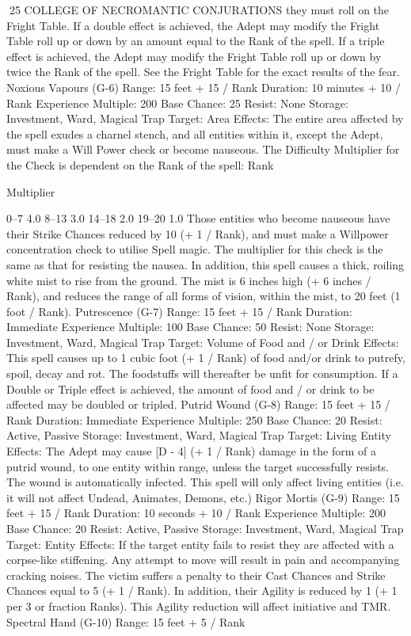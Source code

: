 \documentclass[a4paper]{article}
\begin{document}
\begin{multicols}{3}
25 COLLEGE OF NECROMANTIC CONJURATIONS
they must roll on the Fright Table. If a double
effect is achieved, the Adept may modify the
Fright Table roll up or down by an amount equal to
the Rank of the spell. If a triple effect is achieved,
the Adept may modify the Fright Table roll up or
down by twice the Rank of the spell. See the Fright
Table for the exact results of the fear.
Noxious Vapours (G-6)
Range: 15 feet + 15 / Rank
Duration: 10 minutes + 10 / Rank
Experience Multiple: 200
Base Chance: 25%
Resist: None
Storage: Investment, Ward, Magical Trap
Target: Area
Effects: The entire area affected by the spell exudes
a charnel stench, and all entities within it, except
the Adept, must make a Will Power check or become nauseous. The Difficulty Multiplier for the
Check is dependent on the Rank of the spell:
Rank

Multiplier

0–7
4.0
8–13
3.0
14–18 2.0
19–20 1.0
Those entities who become nauseous have their
Strike Chances reduced by 10 (+ 1 / Rank), and
must make a Willpower concentration check to
utilise Spell magic. The multiplier for this check is
the same as that for resisting the nausea. In addition, this spell causes a thick, roiling white mist to
rise from the ground. The mist is 6 inches high (+ 6
inches / Rank), and reduces the range of all forms
of vision, within the mist, to 20 feet (1 foot /
Rank).
Putrescence (G-7)
Range: 15 feet + 15 / Rank
Duration: Immediate
Experience Multiple: 100
Base Chance: 50%
Resist: None
Storage: Investment, Ward, Magical Trap
Target: Volume of Food and / or Drink
Effects: This spell causes up to 1 cubic foot (+ 1 /
Rank) of food and/or drink to putrefy, spoil, decay
and rot. The foodstuffs will thereafter be unfit for
consumption. If a Double or Triple effect is
achieved, the amount of food and / or drink to be
affected may be doubled or tripled.
Putrid Wound (G-8)
Range: 15 feet + 15 / Rank
Duration: Immediate
Experience Multiple: 250
Base Chance: 20%
Resist: Active, Passive
Storage: Investment, Ward, Magical Trap
Target: Living Entity
Effects: The Adept may cause [D - 4] (+ 1 / Rank)
damage in the form of a putrid wound, to one entity within range, unless the target successfully
resists. The wound is automatically infected. This
spell will only affect living entities (i.e. it will not
affect Undead, Animates, Demons, etc.)
Rigor Mortis (G-9)
Range: 15 feet + 15 / Rank
Duration: 10 seconds + 10 / Rank
Experience Multiple: 200
Base Chance: 20%
Resist: Active, Passive
Storage: Investment, Ward, Magical Trap
Target: Entity
Effects: If the target entity fails to resist they are
affected with a corpse-like stiffening. Any attempt
to move will result in pain and accompanying
cracking noises. The victim suffers a penalty to
their Cast Chances and Strike Chances equal to 5
(+ 1 / Rank). In addition, their Agility is reduced
by 1 (+ 1 per 3 or fraction Ranks). This Agility
reduction will affect initiative and TMR.
Spectral Hand (G-10)
Range: 15 feet + 5 / Rank


\end{multicols}
\end{document}
